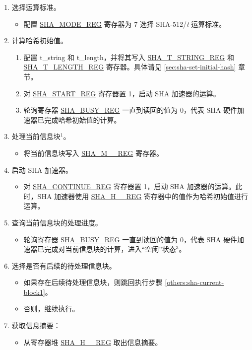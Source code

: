 \begin{enumerate}
    \item \label{others:sha-sel-algorithm2} 选择运算标准。
    \begin{itemize}
        \item 配置 \hyperref[regdesc:SHAMODEREG]{SHA\_MODE\_REG} 寄存器为 7 选择 SHA-512/{\it{t}} 运算标准。
    \end{itemize}
    \item 计算哈希初始值。
        \begin{enumerate}
        \item 配置 t\_string 和 t\_length，并将其写入 \hyperref[regdesc:SHATSTRINGREG]{SHA\_T\_STRING\_REG} 和 \hyperref[regdesc:SHATLENGTHREG]{SHA\_T\_LENGTH\_REG} 寄存器。具体请见 \ref{sec:sha-set-initial-hash} 章节。
        \item 对 \hyperref[regdesc:SHASTARTREG]{SHA\_START\_REG} 寄存器置 1，启动 SHA 加速器的运算。
        \item 轮询寄存器 \hyperref[regdesc:SHABUSYREG]{SHA\_BUSY\_REG} 一直到读回的值为 0，代表 SHA 硬件加速器已完成哈希初始值的计算。
    \end{enumerate}
    
    \item \label{others:sha-current-block1} 处理当前信息块\hyperref[others:sha-note-typical-sha]{$^1$}。
    \begin{itemize}
        \item 将当前信息块写入 \hyperref[regdesc:SHAMNREG]{SHA\_M\_\_REG} 寄存器。
    \end{itemize}
    \item 启动 SHA 加速器。
    \begin{itemize}
        \item 对 \hyperref[regdesc:SHACONTINUEREG]{SHA\_CONTINUE\_REG} 寄存器置 1，启动 SHA 加速器的运算。此时，SHA 加速器使用 \hyperref[regdesc:SHAHNREG]{SHA\_H\_\_REG} 寄存器中的值作为哈希初始值进行运算。
    \end{itemize}
    
    \item 查询当前信息块的处理进度。
    \begin{itemize}
        \item 轮询寄存器 \hyperref[regdesc:SHABUSYREG]{SHA\_BUSY\_REG} 一直到读回的值为 0，代表 SHA 硬件加速器已完成对当前信息块的计算，进入“空闲”状态\hyperref[others:sha-note-typical-sha]{$^3$}。 
    \end{itemize}
    
    \item 选择是否有后续的待处理信息块。
    \begin{itemize}
        \item 如果存在后续待处理信息块，则跳回执行步骤 \ref{others:sha-current-block1}。
        \item 否则，继续执行。
    \end{itemize}
    \item 获取信息摘要：
    \begin{itemize}
        \item 从寄存器堆 \hyperref[regdesc:SHAHNREG]{SHA\_H\_\_REG} 取出信息摘要。
    \end{itemize}
\end{enumerate}